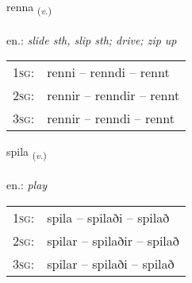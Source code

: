 \documentclass[frontgrid, backgrid]{flacards}\usepackage[]{graphicx}\usepackage[]{xcolor}
\begin{document}
\renewcommand{\flhead}{\vskip5pt \fboxsep=0pt {\small\bfseries\footnotesize Sagnorð | Verb}}
\renewcommand{\fcfoot}{\vskip5pt \fboxsep=0pt \hspace{2pt}{\small\bfseries\footnotesize 1K}}

\renewcommand{\blhead}{\vskip5pt {\small\bfseries\footnotesize Sagnorð | Verb }}
\renewcommand{\bcfoot}{\vskip5pt \hspace{2pt}{\small\bfseries\footnotesize 1K}}


{renna \small{\textsubscript{(\textit{v.})}} \\[1ex] %
\textphonetic{[rɛna]} \\
en.: \emph{slide sth, slip sth; drive; zip up} \\  [2ex]
\renewcommand*{\arraystretch}{0.8}
\begin{tabular}{p{1cm}l}
\textsc{1sg}: & renni -- renndi -- rennt \\ 
\textsc{2sg}: & rennir -- renndir -- rennt \\ 
\textsc{3sg}: & rennir -- renndi -- rennt \\ 
\end{tabular}
}

\renewcommand{\flhead}{\vskip5pt \fboxsep=0pt {\small\bfseries\footnotesize Sagnorð | Verb}}
\renewcommand{\fcfoot}{\vskip5pt \fboxsep=0pt \hspace{2pt}{\small\bfseries\footnotesize 1K}}

\renewcommand{\blhead}{\vskip5pt {\small\bfseries\footnotesize Sagnorð | Verb }}
\renewcommand{\bcfoot}{\vskip5pt \hspace{2pt}{\small\bfseries\footnotesize 1K}}


{spila \small{\textsubscript{(\textit{v.})}} \\[1ex] %
\textphonetic{[spɪːla]} \\
en.: \emph{play} \\  [2ex]
\renewcommand*{\arraystretch}{0.8}
\begin{tabular}{p{1cm}l}
\textsc{1sg}: & spila -- spilaði -- spilað \\ 
\textsc{2sg}: & spilar -- spilaðir -- spilað \\ 
\textsc{3sg}: & spilar -- spilaði -- spilað \\ 
\end{tabular}
}
\end{document}
